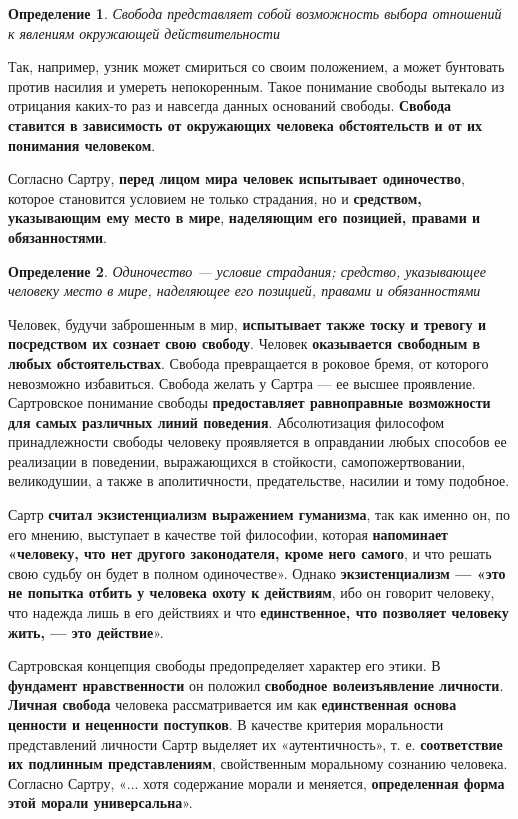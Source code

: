 \documentclass{article}
\newtheorem{definition}{Определение}
\begin{document}
\begin{flushleft}
\begin{definition}
    Свобода представляет собой возможность выбора отношений к явлениям окружающей действительности
\end{definition}

Так, например, узник может смириться со своим положением, а может бунтовать против насилия и умереть непокоренным. Такое понимание свободы вытекало из отрицания каких-то раз и навсегда данных оснований свободы. \textbf{Свобода ставится в зависимость от окружающих человека обстоятельств и от их понимания человеком}.

\hfill

Согласно Сартру, \textbf{перед лицом мира человек испытывает одиночество}, которое становится условием не только страдания, но и \textbf{средством, указывающим ему место в мире}, \textbf{наделяющим его позицией, правами и обязанностями}.

\begin{definition}
    Одиночество — условие страдания; средство, указывающее человеку место в мире, наделяющее его позицией, правами и обязанностями
\end{definition}

Человек, будучи заброшенным в мир, \textbf{испытывает также тоску и тревогу и посредством их сознает свою свободу}. Человек \textbf{оказывается свободным в любых обстоятельствах}. Свобода превращается в роковое бремя, от которого невозможно избавиться. Свобода желать у Сартра — ее высшее проявление. Сартровское понимание свободы \textbf{предоставляет равноправные возможности для самых различных линий поведения}. Абсолютизация философом принадлежности свободы человеку проявляется в оправдании любых способов ее реализации в поведении, выражающихся в стойкости, самопожертвовании, великодушии, а также в аполитичности, предательстве, насилии и тому подобное.

\hfill

Сартр \textbf{считал экзистенциализм выражением гуманизма}, так как именно он, по его мнению, выступает в качестве той философии, которая \textbf{напоминает «человеку, что нет другого законодателя, кроме него самого}, и что решать свою судьбу он будет в полном одиночестве». Однако \textbf{экзистенциализм — «это не попытка отбить у человека охоту к действиям}, ибо он говорит человеку, что надежда лишь в его действиях и что \textbf{единственное, что позволяет человеку жить, — это действие}».

\hfill

Сартровская концепция свободы предопределяет характер его этики. В \textbf{фундамент нравственности} он положил \textbf{свободное волеизъявление личности}. \textbf{Личная свобода} человека рассматривается им как \textbf{единственная основа ценности и неценности поступков}. В качестве критерия моральности представлений личности Сартр выделяет их «аутентичность», т. е. \textbf{соответствие их подлинным представлениям}, свойственным моральному сознанию человека. Согласно Сартру, «... хотя содержание морали и меняется, \textbf{определенная форма этой морали универсальна}».


\end{flushleft}
\end{document}
